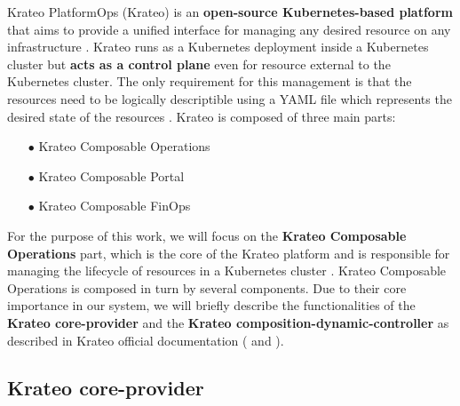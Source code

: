 Krateo PlatformOps (Krateo) is an \textbf{open-source Kubernetes-based platform} that aims to provide a unified interface for managing any desired resource on any infrastructure \cite{krateo_docs}.
Krateo runs as a Kubernetes deployment inside a Kubernetes cluster but \textbf{acts as a control plane} even for resource external to the Kubernetes cluster.
The only requirement for this management is that the resources need to be logically descriptible using a YAML file which represents the desired state of the resources \cite{krateo_docs}.
Krateo is composed of three main parts:
\begin{itemize}[itemsep=0.2pt, topsep=1pt]
    \item[$\bullet$] Krateo Composable Operations
    \item[$\bullet$] Krateo Composable Portal
    \item[$\bullet$] Krateo Composable FinOps
\end{itemize}

For the purpose of this work, we will focus on the \textbf{Krateo Composable Operations} part, which is the core of the Krateo platform and is responsible for managing the lifecycle of resources in a Kubernetes cluster \cite{krateo_docs}.
Krateo Composable Operations is composed in turn by several components. 
Due to their core importance in our system, we will briefly describe the functionalities of the \textbf{Krateo core-provider} and the \textbf{Krateo composition-dynamic-controller} as described in Krateo official documentation (\cite{krateo_core_provider} and \cite{krateo_composition_dynamic_controller}).

\subsection{Krateo core-provider}

